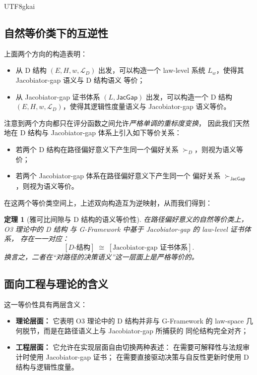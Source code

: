 \documentclass[12pt]{article}
\newtheorem{theorem}{定理}[section]
\newcommand{\JacGap}{\mathsf{JacGap}}
\begin{document}
\begin{CJK*}{UTF8}{gkai}
\subsection{自然等价类下的互逆性}

上面两个方向的构造表明：
\begin{itemize}
  \item 从 D 结构 $(E,H,w,\mathcal{L}_D)$ 出发，可以构造一个
        law-level 系统 $L_w$，使得其 Jacobiator-gap 语义与 D 结构语义
        等价；
  \item 从 Jacobiator-gap 证书体系 $(L,\JacGap)$ 出发，可以构造一个
        D 结构 $(E,H,w,\mathcal{L}_D)$，使得其逻辑性度量语义与
        Jacobiator-gap 语义等价。
\end{itemize}

注意到两个方向都只在评分函数之间允许\emph{严格单调的重标度变换}，
因此我们天然地在 D 结构与 Jacobiator-gap 体系上引入如下等价关系：
\begin{itemize}
  \item 若两个 D 结构在路径偏好意义下产生同一个偏好关系
        $\succ_D$，则视为语义等价；
  \item 若两个 Jacobiator-gap 体系在路径偏好意义下产生同一个
        偏好关系 $\succ_{\JacGap}$，则视为语义等价。
\end{itemize}

在这两个等价类空间上，上述双向构造互为逆映射，从而我们得到：

\begin{theorem}[雅可比间隙与 D 结构的语义等价性]
在路径偏好意义的自然等价类上，O3 理论中的 D 结构
  与 G-Framework 中基于 Jacobiator-gap 的 law-level 证书体系，
  存在一一对应：
  \[
    [D \text{-结构}]
    \;\cong\;
    [\text{Jacobiator-gap 证书体系}].
  \]
  换言之，二者在“对路径的决策语义”这一层面上是严格等价的。
\end{theorem}

\subsection{面向工程与理论的含义}

这一等价性具有两层含义：
\begin{itemize}
  \item \textbf{理论层面：}
        它表明 O3 理论中的 D 结构并非与 G-Framework 的 law-space
        几何脱节，而是在路径语义上与 Jacobiator-gap 所捕获的
        同伦结构完全对齐；
  \item \textbf{工程层面：}
        它允许在实现层面自由切换两种表述：
        在需要可解释性与法规审计时使用 Jacobiator-gap 证书；
        在需要直接驱动决策与自反性更新时使用 D 结构与逻辑性度量。
\end{itemize}


\end{CJK*}
\end{document}
